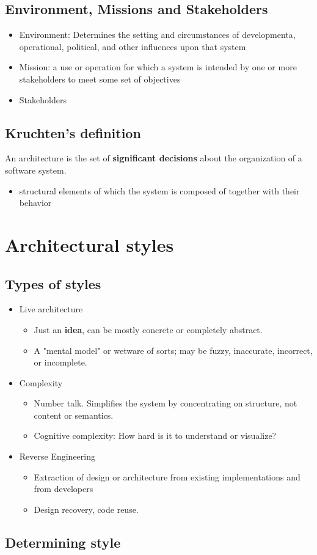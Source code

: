 \documentclass[12pt]{book}
\begin{document}
\subsection*{Environment, Missions and Stakeholders}

\begin{itemize}
  \item Environment: Determines the setting and circumstances of developmenta, operational, political, and other influences upon that system
  \item Mission: a use or operation for which a system is intended by one or more stakeholders to meet some set of objectives
  \item Stakeholders %
\end{itemize}

\subsection*{Kruchten's definition}
An architecture is the set of \textbf{significant decisions} about the organization of a software system.

\begin{itemize}
  \item structural elements of which the system is composed of together with their behavior
\end{itemize}

\section*{Architectural styles}

\subsection*{Types of styles}
\begin{itemize}
  \item Live architecture
  \begin{itemize}
    \item Just an \textbf{idea}, can be mostly concrete or completely abstract.
    \item A "mental model" or wetware of sorts; may be fuzzy, inaccurate, incorrect, or incomplete.
  \end{itemize} 
  \item Complexity
  \begin{itemize}
    \item Number talk. Simplifies the system by concentrating on structure, not content or semantics.
    \item Cognitive complexity: How hard is it to understand or visualize?
  \end{itemize} 
  \item Reverse Engineering
  \begin{itemize}
    \item Extraction of design or architecture from existing implementations and from developers
    \item Design recovery, code reuse.
  \end{itemize} 
\end{itemize}

\subsection*{Determining style}
\end{document}
